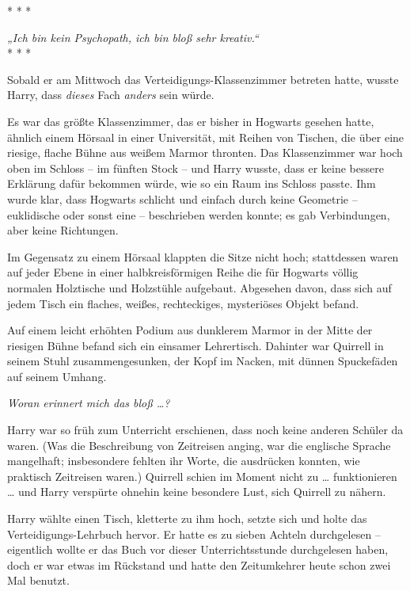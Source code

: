 

\hypertarget{laterales-denken}{%

* * *

\emph{„Ich bin kein Psychopath, ich bin bloß sehr kreativ.“}\\

* * *

Sobald er am Mittwoch das Verteidigungs-Klassenzimmer betreten hatte, wusste Harry, dass \emph{dieses} Fach \emph{anders} sein würde.

Es war das größte Klassenzimmer, das er bisher in Hogwarts gesehen hatte, ähnlich einem Hörsaal in einer Universität, mit Reihen von Tischen, die über eine riesige, flache Bühne aus weißem Marmor thronten. Das Klassenzimmer war hoch oben im Schloss -- im fünften Stock -- und Harry wusste, dass er keine bessere Erklärung dafür bekommen würde, wie so ein Raum ins Schloss passte. Ihm wurde klar, dass Hogwarts schlicht und einfach durch keine Geometrie -- euklidische oder sonst eine -- beschrieben werden konnte; es gab Verbindungen, aber keine Richtungen.

Im Gegensatz zu einem Hörsaal klappten die Sitze nicht hoch; stattdessen waren auf jeder Ebene in einer halbkreisförmigen Reihe die für Hogwarts völlig normalen Holztische und Holzstühle aufgebaut. Abgesehen davon, dass sich auf jedem Tisch ein flaches, weißes, rechteckiges, mysteriöses Objekt befand.

Auf einem leicht erhöhten Podium aus dunklerem Marmor in der Mitte der riesigen Bühne befand sich ein einsamer Lehrertisch. Dahinter war Quirrell in seinem Stuhl zusammengesunken, der Kopf im Nacken, mit dünnen Spuckefäden auf seinem Umhang.

\emph{Woran erinnert mich das bloß …?}

Harry war so früh zum Unterricht erschienen, dass noch keine anderen Schüler da waren. (Was die Beschreibung von Zeitreisen anging, war die englische Sprache mangelhaft; insbesondere fehlten ihr Worte, die ausdrücken konnten, wie praktisch Zeitreisen waren.) Quirrell schien im Moment nicht zu … funktionieren … und Harry verspürte ohnehin keine besondere Lust, sich Quirrell zu nähern.

Harry wählte einen Tisch, kletterte zu ihm hoch, setzte sich und holte das Verteidigungs-Lehrbuch hervor. Er hatte es zu sieben Achteln durchgelesen -- eigentlich wollte er das Buch vor dieser Unterrichtsstunde durchgelesen haben, doch er war etwas im Rückstand und hatte den Zeitumkehrer heute schon zwei Mal benutzt.

}
